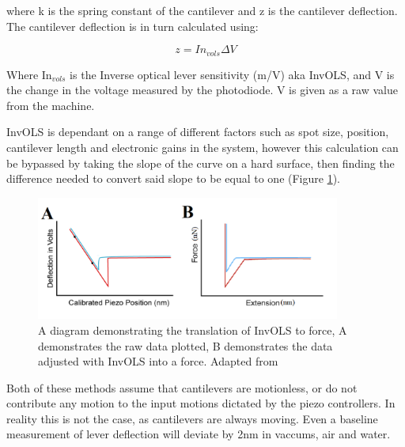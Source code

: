 where k is the spring constant of the cantilever and z is the cantilever deflection. The cantilever deflection is in turn calculated using:

\begin{equation}
z = In_{vols}\Delta V
\end{equation}

Where In$_{vols}$ is the Inverse optical lever sensitivity (m/V) aka InvOLS, and V is the change in the voltage measured by the photodiode. V is given as a raw value from the machine.

InvOLS is dependant on a range of different factors such as spot size, position, cantilever length and electronic gains in the system, however this calculation can be bypassed by taking the slope of the curve on a hard surface, then finding the difference needed to convert said slope to be equal to one (Figure \ref{fig:InvOLS}). 

\begin{figure}[h!]     %
        \begin{center}
          \includegraphics[width=100mm]{chapter2/InvOLS.png}
\end{center}
\caption{A diagram demonstrating the translation of InvOLS to force, A demonstrates the raw data plotted, B demonstrates the data adjusted with InvOLS into a force. Adapted from \cite{AFMTalk}}
\label{fig:InvOLS}                 %
\end{figure}

Both of these methods assume that cantilevers are motionless, or do not contribute any motion to the input motions dictated by the piezo controllers. In reality this is not the case, as cantilevers are always moving. Even a baseline measurement of lever deflection will deviate by 2nm in vaccums, air and water.\cite{AFMTalk} \cite{AFMCalibration, AFMCalibration2}



